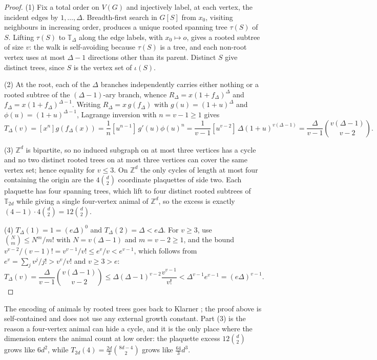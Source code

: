 \documentclass[11pt]{article}
\theoremstyle{plain}
\theoremstyle{definition}
\begin{document}
\begin{proof}
(1) Fix a total order on $V(G)$ and injectively label, at each vertex, the incident
edges by $1,\dots,\Delta$. Breadth-first search in $G[S]$ from $x_0$, visiting
neighbours in increasing order, produces a unique rooted spanning tree $\tau(S)$ of
$S$. Lifting $\tau(S)$ to $\mathbb T_\Delta$ along the edge labels, with
$x_0\mapsto o$, gives a rooted subtree of size $v$: the walk is self-avoiding
because $\tau(S)$ is a tree, and each non-root vertex uses at most $\Delta-1$
directions other than its parent. Distinct $S$ give distinct trees, since $S$ is the
vertex set of $\iota(S)$.

(2) At the root, each of the $\Delta$ branches independently carries either nothing
or a rooted subtree of the $(\Delta-1)$-ary branch, whence
$R_\Delta=x(1+f_\Delta)^\Delta$ and $f_\Delta=x(1+f_\Delta)^{\Delta-1}$. Writing
$R_\Delta=x\,g(f_\Delta)$ with $g(u)=(1+u)^\Delta$ and
$\phi(u)=(1+u)^{\Delta-1}$, Lagrange inversion with $n=v-1\ge1$ gives
\[
 T_\Delta(v)=[x^n]g(f_\Delta(x))=\frac1n[u^{n-1}]\,g'(u)\phi(u)^n
 =\frac1{v-1}[u^{v-2}]\,\Delta(1+u)^{v(\Delta-1)}
 =\frac{\Delta}{v-1}\binom{v(\Delta-1)}{v-2}.
\]

(3) $\mathbb Z^d$ is bipartite, so no induced subgraph on at most three vertices has a
cycle and no two distinct rooted trees on at most three vertices can cover the same
vertex set; hence equality for $v\le3$. On $\mathbb Z^d$ the only cycles of length at
most four containing the origin are the $4\binom d2$ coordinate plaquettes of side
two. Each plaquette has four spanning trees, which lift to four distinct rooted
subtrees of $\mathbb T_{2d}$ while giving a single four-vertex animal of
$\mathbb Z^d$, so the excess is exactly $(4-1)\cdot4\binom d2=12\binom d2$.

(4) $T_\Delta(1)=1=(e\Delta)^0$ and $T_\Delta(2)=\Delta<e\Delta$. For $v\ge3$, use
$\binom Nm\le N^m/m!$ with $N=v(\Delta-1)$ and $m=v-2\ge1$, and the bound
$v^{v-2}/(v-1)!=v^{v-1}/v!\le e^v/v<e^{v-1}$, which follows from
$e^v=\sum_jv^j/j!>v^v/v!$ and $v\ge3>e$:
\[
 T_\Delta(v)=\frac{\Delta}{v-1}\binom{v(\Delta-1)}{v-2}
 \le\Delta(\Delta-1)^{v-2}\frac{v^{v-1}}{v!}<\Delta^{v-1}e^{v-1}=(e\Delta)^{v-1}.
\]
\end{proof}

The encoding of animals by rooted trees goes back to Klarner \cite{klarner}; the
proof above is self-contained and does not use any external growth constant.
Part (3) is the reason a four-vertex animal can hide a cycle, and it is the only place
where the dimension enters the animal count at low order: the plaquette excess
$12\binom{d}{2}$ grows like $6d^2$, while
$T_{2d}(4)=\frac{2d}{3}\binom{8d-4}{2}$ grows like $\frac{64}{3}d^3$.
\end{document}
